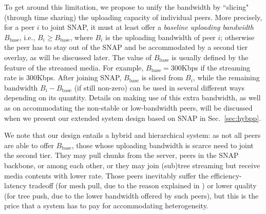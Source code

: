 \documentclass[conference]{IEEEtran}
\begin{document}
  To get around this limitation, we propose to unify the bandwidth by ``slicing" (through time sharing) the uploading capacity of individual peers. More precisely, for a peer $i$ to joint SNAP, it must at least offer a \textit{baseline uploading bandwidth} $B_\mathrm{base}$, i.e., $B_i \geq B_\mathrm{base}$, where $B_i$ is the uploading bandwidth of peer $i$; otherwise the peer has to stay out of the SNAP and be accommodated by a second tier overlay, as will be discussed later. The value of $B_\mathrm{base}$ is usually defined by the feature of the streamed media. For example, $B_\mathrm{base} = 300$Kbps if the streaming rate is 300Kbps. After joining SNAP, $B_\mathrm{base}$ is sliced from $B_i$, while the remaining bandwidth $B_i - B_\mathrm{base}$ (if still non-zero) can be used in several different ways depending on its quantity. Details on making use of this extra bandwidth, as well as on accommodating the non-stable or low-bandwidth peers, will be discussed when we present our extended system design based on SNAP in Sec.~\ref{sec:hybpp}.

  We note that our design entails a hybrid and hierarchical system: as not all peers are able to offer $B_\mathrm{base}$, those whose uploading bandwidth is scarce need to joint the second tier. They may pull chunks from the server, peers in the SNAP backbone, or among each other, or they may join (sub)tree streaming but receive media contents with lower rate. Those peers inevitably suffer the efficiency-latency tradeoff (for mesh pull, due to the reason explained in \cite{FengLL-INFOCOM09}) or lower quality (for tree push, due to the lower bandwidth offered by such peers), but this is the price that a system has to pay for accommodating heterogeneity.
\end{document}
